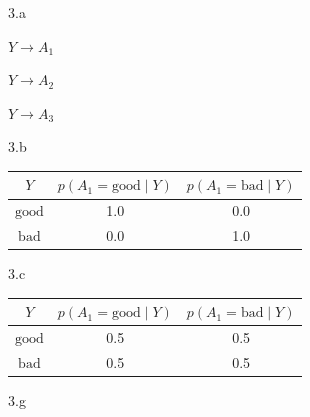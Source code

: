 \LARGE
3.a
\normalsize

\begin{answer}
  $Y \rightarrow A_1$

  $Y \rightarrow A_2$

  $Y \rightarrow A_3$
\end{answer}

\LARGE
3.b
\normalsize

\begin{answer}
  \begin{center}
  \begin{tabular}{|c|c|c|}
  \hline
  $Y$ & $p(A_1 = \text{good} \mid Y)$ & $p(A_1 = \text{bad} \mid Y)$ \\
  \hline
  $\text{good}$ & 1.0 & 0.0 \\
  $\text{bad}$  & 0.0 & 1.0 \\
  \hline
  \end{tabular}
  \end{center}
\end{answer}

\LARGE
3.c
\normalsize

\begin{answer}
  \begin{center}
  \begin{tabular}{|c|c|c|}
  \hline
  $Y$ & $p(A_1 = \text{good} \mid Y)$ & $p(A_1 = \text{bad} \mid Y)$ \\
  \hline
  $\text{good}$ & 0.5 & 0.5 \\
  $\text{bad}$  & 0.5 & 0.5 \\
  \hline
  \end{tabular}
  \end{center}
\end{answer}

\LARGE
3.g
\normalsize

